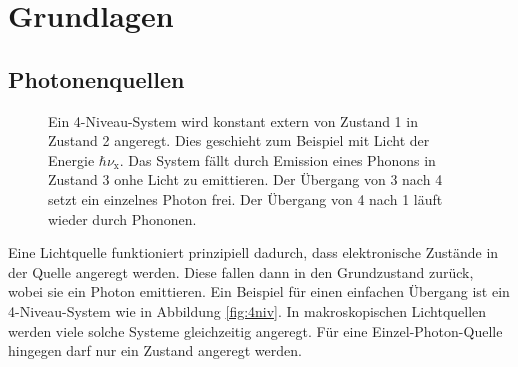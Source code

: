 \section{Grundlagen}
\subsection{Photonenquellen}
\begin{figure}[htbp]
    \begin{minipage}[t][][b]{0.6\textwidth}
        
        \caption{
            Ein 4-Niveau-System wird konstant extern von Zustand 1 in Zustand 2 angeregt.
            Dies geschieht zum Beispiel mit Licht der Energie $\hbar \nu_\text{x}$.
            Das System f\"allt durch Emission eines Phonons in Zustand 3 onhe Licht zu emittieren.
            Der \"Ubergang von 3 nach 4 setzt ein einzelnes Photon frei.
            Der \"Ubergang von 4 nach 1 l\"auft wieder durch Phononen.
        }
        \label{fig:4niv}
    \end{minipage}
    \hfill
    \begin{minipage}[t][][b]{0.38\textwidth}
        \flushright
    \end{minipage}
\end{figure}
Eine Lichtquelle funktioniert prinzipiell dadurch, dass elektronische Zust\"ande in der Quelle angeregt werden.
Diese fallen dann in den Grundzustand zur\"uck, wobei sie ein Photon emittieren.
Ein Beispiel f\"ur einen einfachen \"Ubergang ist ein 4-Niveau-System wie in Abbildung \vref{fig:4niv}.
In makroskopischen Lichtquellen werden viele solche Systeme gleichzeitig angeregt.
F\"ur eine Einzel-Photon-Quelle hingegen darf nur ein Zustand angeregt werden.




